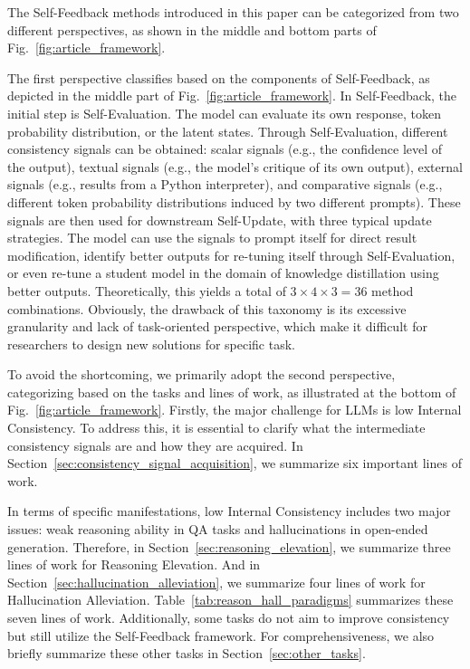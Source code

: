 \documentclass[lettersize,journal]{IEEEtran}
\begin{document}
\noindent The Self-Feedback methods introduced in this paper can be categorized from two different perspectives, as shown in the middle and bottom parts of Fig.~\ref{fig:article_framework}.

The first perspective classifies based on the components of Self-Feedback, as depicted in the middle part of Fig.~\ref{fig:article_framework}. In Self-Feedback, the initial step is Self-Evaluation. The model can evaluate its own response, token probability distribution, or the latent states. Through Self-Evaluation, different consistency signals can be obtained: scalar signals (e.g., the confidence level of the output), textual signals (e.g., the model's critique of its own output), external signals (e.g., results from a Python interpreter), and comparative signals (e.g., different token probability distributions induced by two different prompts). These signals are then used for downstream Self-Update, with three typical update strategies. The model can use the signals to prompt itself for direct result modification, identify better outputs for re-tuning itself through Self-Evaluation, or even re-tune a student model in the domain of knowledge distillation using better outputs. Theoretically, this yields a total of $3\times4\times3=36$ method combinations. Obviously, the drawback of this taxonomy is its excessive granularity and lack of task-oriented perspective, which make it difficult for researchers to design new solutions for specific task.

To avoid the shortcoming, we primarily adopt the second perspective, categorizing based on the tasks and lines of work, as illustrated at the bottom of Fig.~\ref{fig:article_framework}. Firstly, the major challenge for LLMs is low Internal Consistency. To address this, it is essential to clarify what the intermediate consistency signals are and how they are acquired. In Section~\ref{sec:consistency_signal_acquisition}, we summarize six important lines of work.

In terms of specific manifestations, low Internal Consistency includes two major issues: weak reasoning ability in QA tasks and hallucinations in open-ended generation. Therefore, in Section~\ref{sec:reasoning_elevation}, we summarize three lines of work for Reasoning Elevation. And in Section~\ref{sec:hallucination_alleviation}, we summarize four lines of work for Hallucination Alleviation. Table~\ref{tab:reason_hall_paradigms} summarizes these seven lines of work. Additionally, some tasks do not aim to improve consistency but still utilize the Self-Feedback framework. For comprehensiveness, we also briefly summarize these other tasks in Section~\ref{sec:other_tasks}.
\end{document}
